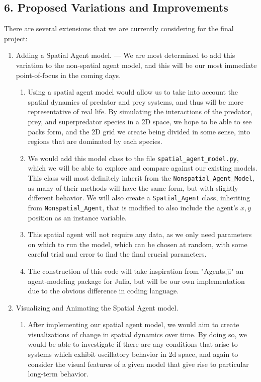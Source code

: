 \documentclass{article}
\begin{document}
\subsection*{6. Proposed Variations and Improvements}
There are several extensions that we are currently considering for the final project:
\begin{enumerate}
    \item Adding a Spatial Agent model. --- We are most determined to add this variation to the non-spatial agent model, and this will be our most immediate point-of-focus in the coming days.\begin{enumerate}
        \item Using a spatial agent model would allow us to take into account the spatial dynamics of predator and prey systems, and thus will be more representative of real life. By simulating the interactions of the predator, prey, and superpredator species in a 2D space, we hope to be able to see packs form, and the 2D grid we create being divided in some sense, into regions that are dominated by each species.
        \item We would add this model class to the file \verb|spatial_agent_model.py|, which we will be able to explore and compare against our existing models. This class will most definitely inherit from the \verb|Nonspatial_Agent_Model|, as many of their methods will have the same form, but with slightly different behavior. We will also create a \verb|Spatial_Agent| class, inheriting from \verb|Nonspatial_Agent|, that is modified to also include the agent's $x,y$ position as an instance variable.
        \item This spatial agent will not require any data, as we only need parameters on which to run the model, which can be chosen at random, with some careful trial and error to find the final crucial parameters.
        \item The construction of this code will take inspiration from "Agents.ji" an agent-modeling package for Julia, but will be our own implementation due to the obvious difference in coding language. \cite{Agents.jl}
    \end{enumerate}
    \item Visualizing and Animating the Spatial Agent model.\begin{enumerate}
        \item After implementing our spatial agent model, we would aim to create visualizations of change in spatial dynamics over time. By doing so, we would be able to investigate if there are any conditions that arise to systems which exhibit oscillatory behavior in 2d space, and again to consider the visual features of a given model that give rise to particular long-term behavior.

\end{enumerate}
\end{enumerate}
\end{document}
